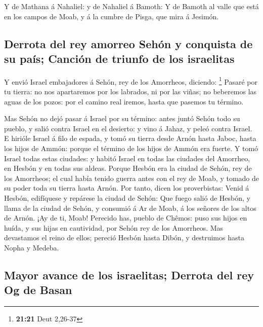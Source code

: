  Y de Mathana á Nahaliel: y de Nahaliel á Bamoth:
 Y de Bamoth al valle que está en los campos de Moab, y á
la cumbre de Pisga, que mira á Jesimón.

\hypertarget{derrota-del-rey-amorreo-sehuxf3n-y-conquista-de-su-pauxeds-canciuxf3n-de-triunfo-de-los-israelitas}{%
\subsection{Derrota del rey amorreo Sehón y conquista de su país;
Canción de triunfo de los
israelitas}\label{derrota-del-rey-amorreo-sehuxf3n-y-conquista-de-su-pauxeds-canciuxf3n-de-triunfo-de-los-israelitas}}

 Y envió Israel embajadores á Sehón, rey de los
Amorrheos, diciendo: \footnote{\textbf{21:21} Deut 2,26-37}
 Pasaré por tu tierra: no nos apartaremos por los
labrados, ni por las viñas; no beberemos las aguas de los pozos: por el
camino real iremos, hasta que pasemos tu término.

 Mas Sehón no dejó pasar á Israel por su término: antes
juntó Sehón todo su pueblo, y salió contra Israel en el desierto: y vino
á Jahaz, y peleó contra Israel.  E hirióle Israel á filo
de espada, y tomó su tierra desde Arnón hasta Jaboc, hasta los hijos de
Ammón: porque el término de los hijos de Ammón era fuerte.
 Y tomó Israel todas estas ciudades: y habitó Israel en
todas las ciudades del Amorrheo, en Hesbón y en todas sus aldeas.
 Porque Hesbón era la ciudad de Sehón, rey de los
Amorrheos; el cual había tenido guerra antes con el rey de Moab, y
tomado de su poder toda su tierra hasta Arnón.  Por
tanto, dicen los proverbistas: Venid á Hesbón, edifíquese y repárese la
ciudad de Sehón:  Que fuego salió de Hesbón, y llama de
la ciudad de Sehón, y consumió á Ar de Moab, á los señores de los altos
de Arnón.  ¡Ay de ti, Moab! Perecido has, pueblo de
Chêmos: puso sus hijos en huída, y sus hijas en cautividad, por Sehón
rey de los Amorrheos.  Mas devastamos el reino de ellos;
pereció Hesbón hasta Dibón, y destruimos hasta Nopha y Medeba.

\hypertarget{mayor-avance-de-los-israelitas-derrota-del-rey-og-de-basan}{%
\subsection{Mayor avance de los israelitas; Derrota del rey Og de
Basan}\label{mayor-avance-de-los-israelitas-derrota-del-rey-og-de-basan}}

